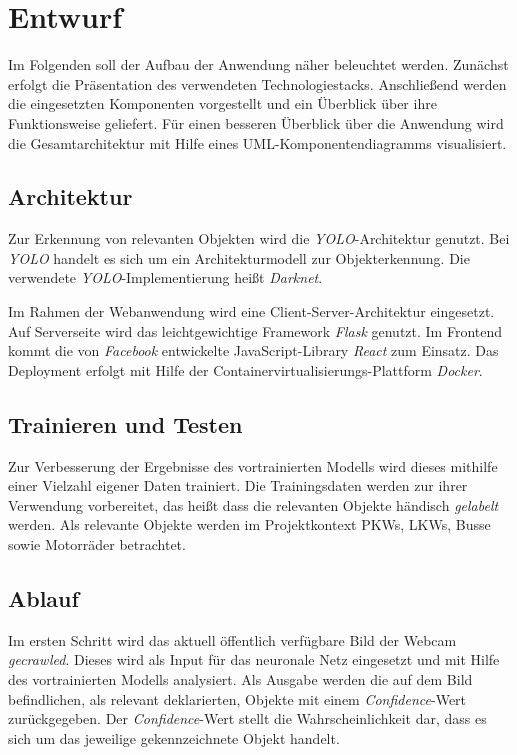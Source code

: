 \section{Entwurf}

Im Folgenden soll der Aufbau der Anwendung näher beleuchtet werden.
Zunächst erfolgt die Präsentation des verwendeten Technologiestacks. 
Anschließend werden die eingesetzten Komponenten vorgestellt und ein Überblick über ihre Funktionsweise geliefert.
Für einen besseren Überblick über die Anwendung wird die Gesamtarchitektur mit Hilfe eines UML-Komponentendiagramms 
visualisiert.

\subsection{Architektur}

Zur Erkennung von relevanten Objekten wird die \textit{YOLO}-Architektur genutzt.
Bei \textit{YOLO} handelt es sich um ein Architekturmodell zur Objekterkennung.
Die verwendete \textit{YOLO}-Implementierung heißt \textit{Darknet}. 


Im Rahmen der Webanwendung wird eine Client-Server-Architektur eingesetzt. 
Auf Serverseite wird das leichtgewichtige Framework \textit{Flask} genutzt.
Im Frontend kommt die von \textit{Facebook} entwickelte JavaScript-Library \textit{React} zum Einsatz.
Das Deployment erfolgt mit Hilfe der Containervirtualisierungs-Plattform \textit{Docker}.


\subsection{Trainieren und Testen}

Zur Verbesserung der Ergebnisse des vortrainierten Modells wird dieses mithilfe einer Vielzahl eigener Daten trainiert.
Die Trainingsdaten werden zur ihrer Verwendung vorbereitet, das heißt dass die relevanten Objekte händisch 
\textit{gelabelt} werden. Als relevante Objekte werden im Projektkontext PKWs, LKWs, Busse sowie Motorräder betrachtet.

\subsection{Ablauf}

Im ersten Schritt wird das aktuell öffentlich verfügbare Bild der Webcam \textit{gecrawled}. 
Dieses wird als Input für das neuronale Netz eingesetzt und mit Hilfe des vortrainierten Modells analysiert.
Als Ausgabe werden die auf dem Bild befindlichen, als relevant deklarierten, Objekte mit einem \textit{Confidence}-Wert
zurückgegeben. 
Der \textit{Confidence}-Wert stellt die Wahrscheinlichkeit dar, dass es sich um das jeweilige gekennzeichnete Objekt handelt.

